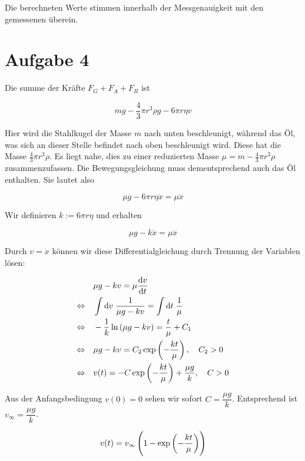 \documentclass[a4paper,german,12pt,smallheadings]{scrartcl}
\begin{document}
Die berechneten Werte stimmen innerhalb der Messgenauigkeit mit den
gemessenen überein.

\section*{Aufgabe 4}

Die summe der Kräfte  $F_G + F_A + F_R$ ist

\begin{equation}
  mg - \frac{4}{3} \pi r^3 \rho g - 6 \pi r \eta v
\end{equation}

Hier wird die Stahlkugel der Masse $m$ nach unten beschleunigt, während das Öl,
was sich an dieser Stelle befindet nach oben beschleunigt wird. Diese hat die
Masse $\frac{4}{3} \pi r^3 \rho$. Es liegt nahe, dies zu einer reduzierten
Masse $\mu = m - \frac{4}{3} \pi r^3 \rho$ zusammenzufassen. Die
Bewegungsgleichung muss dementsprechend auch das Öl enthalten. Sie lautet also

\begin{equation}
  \mu g - 6 \pi r \eta \dot{x} = \mu \ddot{x}
\end{equation}

Wir definieren $k := 6 \pi r \eta$ und erhalten

\begin{equation}
  \mu g - k \dot{x} = \mu \ddot{x}
\end{equation}

Durch $v = \dot{x}$ können wir diese Differentialgleichung durch Trennung der
Variablen lösen:

\begin{align*}
  &\mu g - k v = \mu \frac{\dif v}{\dif t} \\
  \Leftrightarrow \quad &
  \int \dif v \; \frac{1}{\mu g - kv} = \int \dif t \; \frac{1}{\mu} \\
  \Leftrightarrow \quad &
  -\frac{1}{k} \ln \del{\mu g - kv} = \frac{t}{\mu} + C_1 \\
  \Leftrightarrow \quad &
  \mu g - kv = C_2 \exp \del{- \frac{kt}{\mu} }, \quad C_2 > 0 \\
  \Leftrightarrow \quad &
  v(t) = -C \exp \del{- \frac{kt}{\mu} } + \frac{\mu g}{k}, \quad C > 0
\end{align*}

Aus der Anfangsbedingung $v(0) = 0$ sehen wir sofort $C = \dfrac{\mu g}{k}$.
Entsprechend ist $v_\infty = \dfrac{\mu g}{k}$.

\begin{equation}
  v(t) = v_\infty \del{1 - \exp\del{-\frac{k t}{\mu}}}
\end{equation}
\end{document}
